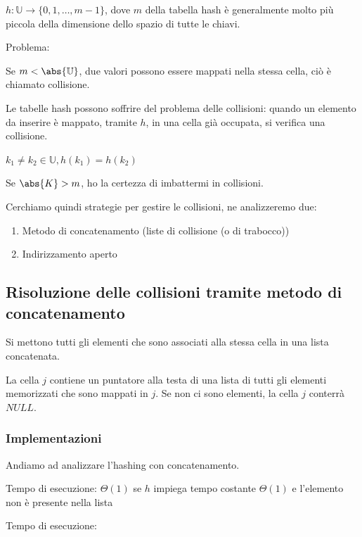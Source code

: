 \documentclass[tikz]{article}
\providecommand{\tightlist}{%
  \setlength{\itemsep}{0pt}\setlength{\parskip}{0pt}}
\begin{document}
{$h:\mathbb{U}\rightarrow\{0,1,\ldots,m-1\}$, dove $m$ della tabella hash è generalmente molto più piccola della dimensione dello spazio di tutte le chiavi.}

{Problema: }

{Se $m < \abs{\mathbb{U}}$, due valori possono essere mappati nella stessa cella, ciò è chiamato collisione. }

{Le tabelle hash possono soffrire del problema delle collisioni: quando un elemento da inserire è mappato, tramite $h$, in una cella già occupata, si verifica una collisione.}

$k_1 \neq k_2 \in \mathbb{U}, h(k_1) = h(k_2)$

{Se $\abs{K} > m$, ho la certezza di imbattermi in collisioni.}

{Cerchiamo quindi strategie per gestire le collisioni, ne analizzeremo due:}

\begin{enumerate}
\tightlist
\item
  {Metodo di concatenamento (liste di collisione (o di trabocco))}
\item
  {Indirizzamento aperto}
\end{enumerate}

\subsection{Risoluzione delle collisioni tramite metodo di concatenamento}

{Si mettono tutti gli elementi che sono associati alla stessa cella in una lista concatenata.}

{La cella $j$ contiene un puntatore alla testa di una lista di tutti gli elementi memorizzati che sono mappati in $j$. Se non ci sono elementi, la cella $j$ conterrà $NULL$.}

\subsubsection{Implementazioni}

{Andiamo ad analizzare l'hashing con concatenamento.}



{Tempo di esecuzione: $\Theta(1)$ se $h$ impiega tempo costante $\Theta(1)$ e l'elemento non è presente nella lista}



{Tempo di esecuzione:}
\end{document}
